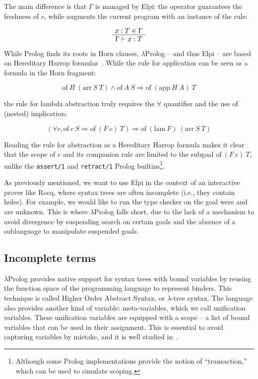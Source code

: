 \documentclass[a4paper, 11pt]{book}
\newenvironment{bprooftree}
  {\leavevmode\hbox\bgroup}
  {\DisplayProof\egroup}
\begin{document}
The main difference is that $\Gamma$ is managed by Elpi: the 
operator guarantees the freshness of $c$, while \elpi{=>} augments the
current program with an instance of the rule:

$$
\begin{bprooftree}
  \AxiomC{$x : T \in \Gamma$}
  \UnaryInfC{$\Gamma \vdash x : T$}
\end{bprooftree}
$$


While Prolog finds its roots in Horn clauses, $\lambda$Prolog -- and thus Elpi -- are
based on Hereditary Harrop formulas~\cite{Miller_Nadathur_2012}. While the rule
for application can be seen as a formula in the Horn fragment:

$$
\mathrm{of}~ H~(\mathrm{arr}~S~T) \land \mathrm{of}~A~S \Rightarrow
\mathrm{of}~(\mathrm{app}~H~A)~T
$$

\noindent the rule for lambda abstraction truly requires the $\forall$
quantifier and the use of (nested) implication:

$$
(\forall c, \mathrm{of}~c~S \Rightarrow  \mathrm{of}~(F~c)~T) \Rightarrow
\mathrm{of}~(\mathrm{lam}~F)~(\mathrm{arr}~S~T)
$$

Reading the rule for abstraction as a Hereditary Harrop formula makes it clear
that the scope of $c$ and its companion rule are limited to the subgoal
$\mathrm{of}~(F~c)~T$, unlike the \texttt{assert/1} and \texttt{retract/1}
Prolog builtins\footnote{Although some Prolog implementations provide the
notion of ``transaction,'' which can be used to simulate scoping.}.

As previously mentioned, we want to use Elpi in the context of an interactive
prover like Rocq, where syntax trees are often incomplete (i.e., they contain
holes). For example, we would like to run the type checker on the goal
 were  and  are unknown.
This is where $\lambda$Prolog falls short, due to the
lack of a mechanism to avoid divergence by suspending search on certain goals
and the absence of a sublanguage to manipulate suspended goals.


\subsection{Incomplete terms}


$\lambda$Prolog provides native support for syntax trees with bound variables
by reusing the function space of the programming language to represent
binders. This technique is called Higher Order Abstract Syntax, or
$\lambda$-tree syntax. The language also provides another kind of variable:
meta-variables, which we call unification variables. These unification
variables are equipped with a scope -- a list of bound variables that can be
used in their assignment. This is essential to avoid capturing variables by
mistake, and it is well studied in~\cite{miller92jsc}.
\end{document}
